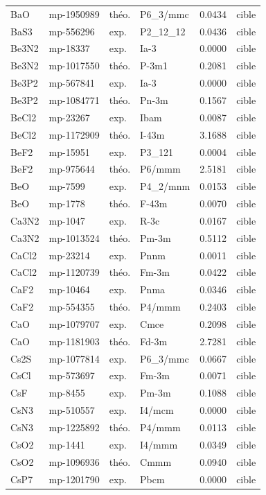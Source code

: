 \begin{longtable}{@{}lllllr@{}}
BaO & mp-1950989 & théo. & P6\_3/mmc & 0.0434 & cible \\
BaS3 & mp-556296 & exp. & P2\_12\_12 & 0.0436 & cible \\
Be3N2 & mp-18337 & exp. & Ia-3 & 0.0000 & cible \\
Be3N2 & mp-1017550 & théo. & P-3m1 & 0.2081 & cible \\
Be3P2 & mp-567841 & exp. & Ia-3 & 0.0000 & cible \\
Be3P2 & mp-1084771 & théo. & Pn-3m & 0.1567 & cible \\
BeCl2 & mp-23267 & exp. & Ibam & 0.0087 & cible \\
BeCl2 & mp-1172909 & théo. & I-43m & 3.1688 & cible \\
BeF2 & mp-15951 & exp. & P3\_121 & 0.0004 & cible \\
BeF2 & mp-975644 & théo. & P6/mmm & 2.5181 & cible \\
BeO & mp-7599 & exp. & P4\_2/mnm & 0.0153 & cible \\
BeO & mp-1778 & théo. & F-43m & 0.0070 & cible \\
Ca3N2 & mp-1047 & exp. & R-3c & 0.0167 & cible \\
Ca3N2 & mp-1013524 & théo. & Pm-3m & 0.5112 & cible \\
CaCl2 & mp-23214 & exp. & Pnnm & 0.0011 & cible \\
CaCl2 & mp-1120739 & théo. & Fm-3m & 0.0422 & cible \\
CaF2 & mp-10464 & exp. & Pnma & 0.0346 & cible \\
CaF2 & mp-554355 & théo. & P4/mmm & 0.2403 & cible \\
CaO & mp-1079707 & exp. & Cmce & 0.2098 & cible \\
CaO & mp-1181903 & théo. & Fd-3m & 2.7281 & cible \\
Cs2S & mp-1077814 & exp. & P6\_3/mmc & 0.0667 & cible \\
CsCl & mp-573697 & exp. & Fm-3m & 0.0071 & cible \\
CsF & mp-8455 & exp. & Pm-3m & 0.1088 & cible \\
CsN3 & mp-510557 & exp. & I4/mcm & 0.0000 & cible \\
CsN3 & mp-1225892 & théo. & P4/mmm & 0.0113 & cible \\
CsO2 & mp-1441 & exp. & I4/mmm & 0.0349 & cible \\
CsO2 & mp-1096936 & théo. & Cmmm & 0.0940 & cible \\
CsP7 & mp-1201790 & exp. & Pbcm & 0.0000 & cible \\

\end{longtable}
